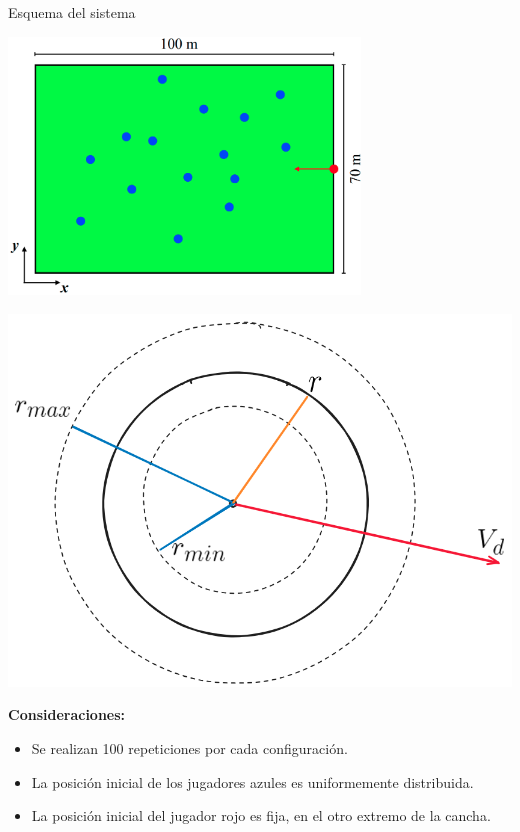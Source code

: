 \begin{frame}{Esquema del sistema}
    \begin{center}
        \begin{minipage}{0.55\textwidth}
            \includegraphics[width=0.7\textwidth]{pic/04-simulaciones/esquema-field}
        \end{minipage}
        \hfill
        \begin{minipage}{0.4\textwidth}
            \includegraphics[width=\textwidth]{pic/04-simulaciones/esquema-particula}
        \end{minipage}
    \end{center}

    \footnotesize{
        \textbf{Consideraciones:}
        \begin{itemize}
            \item Se realizan 100 repeticiones por cada configuración.
            \item La posición inicial de los jugadores azules es uniformemente distribuida.
            \item La posición inicial del jugador rojo es fija, en el otro extremo de la cancha.
        \end{itemize}
    }

\end{frame}


